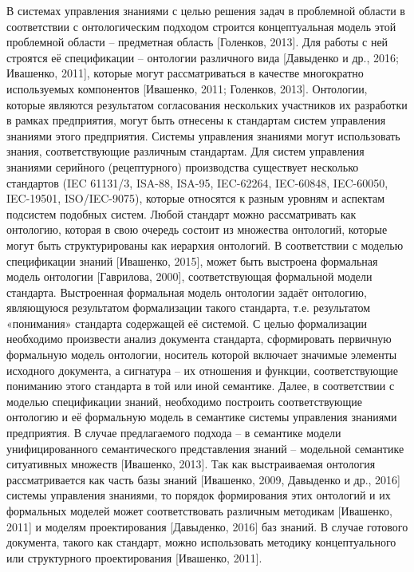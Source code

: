 В системах управления знаниями с целью решения задач в проблемной области в соответствии с онтологическим подходом строится концептуальная модель этой проблемной области – предметная область [Голенков, 2013]. Для работы с ней строятся её спецификации – онтологии различного вида [Давыденко и др., 2016; Ивашенко, 2011], которые могут рассматриваться в качестве многократно используемых компонентов [Ивашенко, 2011; Голенков, 2013]. Онтологии, которые являются результатом согласования нескольких участников их разработки в рамках предприятия, могут быть отнесены к стандартам систем управления знаниями этого предприятия.
Системы управления знаниями могут использовать знания, соответствующие различным стандартам. Для систем управления знаниями серийного (рецептурного) производства существует несколько стандартов (IEC 61131/3, ISA-88, ISA-95, IEC-62264, IEC-60848, IEC-60050, IEC-19501, ISO/IEC-9075), которые относятся к разным уровням и аспектам подсистем подобных систем.
Любой стандарт можно рассматривать как онтологию, которая в свою очередь состоит из множества онтологий, которые могут быть структурированы как иерархия онтологий. В соответствии с моделью спецификации знаний [Ивашенко, 2015], может быть выстроена формальная модель онтологии [Гаврилова, 2000], соответствующая формальной модели стандарта. Выстроенная формальная модель онтологии задаёт онтологию, являющуюся результатом формализации такого стандарта, т.е. результатом «понимания» стандарта содержащей её системой. С целью формализации необходимо произвести анализ документа стандарта, сформировать первичную формальную модель онтологии, носитель которой включает значимые элементы исходного документа, а сигнатура – их отношения и функции, соответствующие пониманию этого стандарта в той или иной семантике. Далее, в соответствии с моделью спецификации знаний, необходимо построить соответствующие онтологию и её формальную модель в семантике системы управления знаниями предприятия. В случае предлагаемого подхода – в семантике модели унифицированного семантического представления знаний – модельной семантике ситуативных множеств [Ивашенко, 2013]. Так как выстраиваемая онтология рассматривается как часть базы знаний [Ивашенко, 2009, Давыденко и др., 2016] системы управления знаниями, то порядок формирования этих онтологий и их формальных моделей может соответствовать различным методикам [Ивашенко, 2011] и моделям проектирования [Давыденко, 2016] баз знаний.
В случае готового документа, такого как стандарт, можно использовать методику концептуального или структурного проектирования [Ивашенко, 2011].

